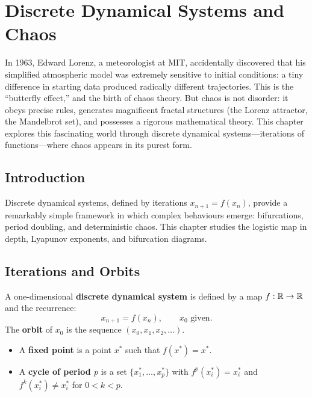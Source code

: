 \chapter{Discrete Dynamical Systems and Chaos}
\label{ch:chaos}

In 1963, Edward Lorenz, a meteorologist at MIT, accidentally discovered that his simplified atmospheric model was extremely sensitive to initial conditions: a tiny difference in starting data produced radically different trajectories. This is the ``butterfly effect,'' and the birth of chaos theory. But chaos is not disorder: it obeys precise rules, generates magnificent fractal structures (the Lorenz attractor, the Mandelbrot set), and possesses a rigorous mathematical theory. This chapter explores this fascinating world through discrete dynamical systems---iterations of functions---where chaos appears in its purest form.

\section{Introduction}

Discrete dynamical systems, defined by iterations $x_{n+1}=f(x_n)$,
provide a remarkably simple framework in which complex behaviours
emerge: bifurcations, period doubling, and deterministic chaos.
This chapter studies the logistic map in depth, Lyapunov exponents,
and bifurcation diagrams.

\section{Iterations and Orbits}

\begin{definition}
A one-dimensional \textbf{discrete dynamical system} is defined by a
map $f:\mathbb{R}\to\mathbb{R}$ and the recurrence:
\[
  x_{n+1} = f(x_n), \qquad x_0 \text{ given}.
\]
The \textbf{orbit} of $x_0$ is the sequence $(x_0, x_1, x_2, \ldots)$.
\end{definition}

\begin{definition}
\begin{itemize}
  \item A \textbf{fixed point} is a point $x^*$ such that $f(x^*)=x^*$.
  \item A \textbf{cycle of period $p$} is a set
    $\{x_1^*,\ldots,x_p^*\}$ with $f^p(x_i^*)=x_i^*$ and
    $f^k(x_i^*)\neq x_i^*$ for $0<k<p$.
\end{itemize}
\end{definition}

